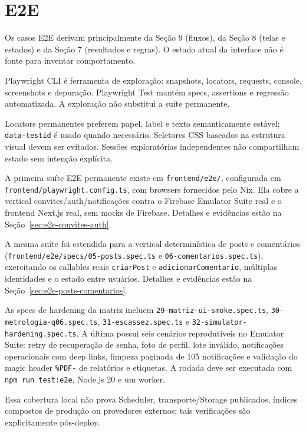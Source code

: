 \section{E2E}

Os casos E2E derivam principalmente da Seção 9 (fluxos), da Seção 8 (telas e
estados) e da Seção 7 (resultados e regras). O estado atual da interface não é
fonte para inventar comportamento.

Playwright CLI é ferramenta de exploração: snapshots, locators, requests,
console, screenshots e depuração. Playwright Test mantém specs, assertions e
regressão automatizada. A exploração não substitui a suite permanente.

Locators permanentes preferem papel, label e texto semanticamente estável;
\texttt{data-testid} é usado quando necessário. Seletores CSS baseados na
estrutura visual devem ser evitados. Sessões exploratórias independentes não
compartilham estado sem intenção explícita.

A primeira suíte E2E permanente existe em \texttt{frontend/e2e/}, configurada em
\texttt{frontend/playwright.config.ts}, com browsers fornecidos pelo Nix. Ela cobre
a vertical convites/auth/notificações contra o Firebase Emulator Suite real e o
frontend Next.js real, sem mocks de Firebase. Detalhes e evidências estão na
Seção~\ref{sec:e2e-convites-auth}.

A mesma suíte foi estendida para a vertical determinística de posts e
comentários (\texttt{frontend/e2e/specs/05-posts.spec.ts} e
\texttt{06-comentarios.spec.ts}), exercitando os callables reais
\texttt{criarPost} e \texttt{adicionarComentario}, múltiplas identidades e o
estado entre usuários. Detalhes e evidências estão na
Seção~\ref{sec:e2e-posts-comentarios}.

As specs de hardening da matriz incluem
\texttt{29-matriz-ui-smoke.spec.ts}, \texttt{30-metrologia-q06.spec.ts},
\texttt{31-escassez.spec.ts} e
\texttt{32-simulator-hardening.spec.ts}. A última possui seis cenários
reprodutíveis no Emulator Suite: retry de recuperação de senha, foto de perfil,
lote inválido, notificações operacionais com deep links, limpeza paginada de
105 notificações e validação do magic header \texttt{\%PDF-} de relatórios e
etiquetas. A rodada deve ser executada com \texttt{npm run test:e2e}, Node.js 20
e um worker.

Essa cobertura local não prova Scheduler, transporte/Storage publicados,
índices compostos de produção ou provedores externos; tais verificações são
explicitamente pós-deploy.


